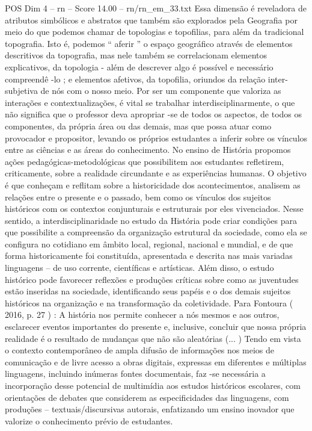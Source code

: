 \begin{textsample}{POS Dim 4 – rn – Score 14.00 – rn/rn\_em\_33.txt}
Essa dimensão é reveladora de atributos simbólicos e abstratos que também são explorados pela Geografia por meio do que podemos chamar de topologias e topofilias, para além da tradicional topografia.
Isto é, podemos “ aferir ” o espaço geográfico através de elementos descritivos da topografia, mas nele também se correlacionam elementos explicativos, da topologia - além de descrever algo é possível e necessário compreendê -lo ; e elementos afetivos, da topofilia, oriundos da relação inter-subjetiva de nós com o nosso meio.
Por ser um componente que valoriza as interações e contextualizações, é vital se trabalhar interdisciplinarmente, o que não significa que o professor deva apropriar -se de todos os aspectos, de todos os componentes, da própria área ou das demais, mas que possa atuar como provocador e propositor, levando os próprios estudantes a inferir sobre os vínculos entre as ciências e as áreas do conhecimento.
No ensino de História propomos ações pedagógicas-metodológicas que possibilitem aos estudantes refletirem, criticamente, sobre a realidade circundante e as experiências humanas.
O objetivo é que conheçam e reflitam sobre a historicidade dos acontecimentos, analisem as relações entre o presente e o passado, bem como os vínculos dos sujeitos históricos com os contextos conjunturais e estruturais por eles vivenciados.
Nesse sentido, a interdisciplinaridade no estudo da História pode criar condições para que possibilite a compreensão da organização estrutural da sociedade, como ela se configura no cotidiano em âmbito local, regional, nacional e mundial, e de que forma historicamente foi constituída, apresentada e descrita nas mais variadas linguagens – de uso corrente, científicas e artísticas.
Além disso, o estudo histórico pode favorecer reflexões e produções críticas sobre como as juventudes estão inseridas na sociedade, identificando seus papéis e o dos demais sujeitos históricos na organização e na transformação da coletividade.
Para Fontoura ( 2016, p. 27 ) : A história nos permite conhecer a nós mesmos e aos outros, esclarecer eventos importantes do presente e, inclusive, concluir que nossa própria realidade é o resultado de mudanças que não são aleatórias (... ) Tendo em vista o contexto contemporâneo de ampla difusão de informações nos meios de comunicação e de livre acesso a obras digitais, expressas em diferentes e múltiplas linguagens, incluindo inúmeras fontes documentais, faz -se necessária a incorporação desse potencial de multimídia aos estudos históricos escolares, com orientações de debates que considerem as especificidades das linguagens, com produções – textuais/discursivas autorais, enfatizando um ensino inovador que valorize o conhecimento prévio de estudantes.

\end{textsample}
